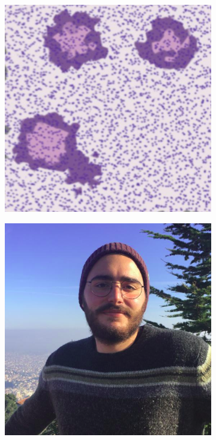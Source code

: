 \begin{description}
    \begin{figure}
        \centering
        \begin{subfigure}[t]{0.2\textwidth}
             \centering
             \includegraphics[width = \textwidth]{images/gauss_blurr}
             \caption{}
             \label{fig:gauss_blurr}
        \end{subfigure}
        \quad
        \begin{subfigure}[t]{0.2\textwidth}
             \centering
             \includegraphics[width = \textwidth]{images/me}

\end{subfigure}
\end{figure}
\end{description}
